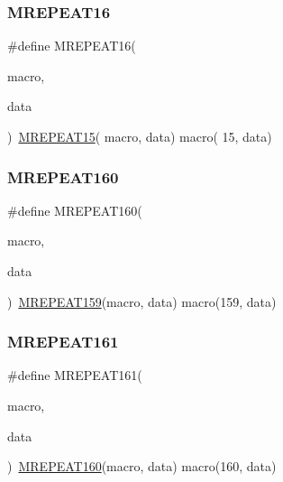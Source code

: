 \mbox{\label{group__group__sam0__utils__mrepeat_gaf3c066d33ccd6fd8378495955121baae}} 
\subsubsection{\texorpdfstring{MREPEAT16}{MREPEAT16}}
{\footnotesize\ttfamily \#define M\+R\+E\+P\+E\+A\+T16(\begin{DoxyParamCaption}\item[{}]{macro,  }\item[{}]{data }\end{DoxyParamCaption})~\mbox{\hyperlink{group__group__sam0__utils__mrepeat_gaa3c5de4c7a937ef2f00049285ed41a0a}{M\+R\+E\+P\+E\+A\+T15}}( macro, data)   macro( 15, data)}

\mbox{\label{group__group__sam0__utils__mrepeat_gad1af2da931db2624f37a6357de14bc12}} 
\subsubsection{\texorpdfstring{MREPEAT160}{MREPEAT160}}
{\footnotesize\ttfamily \#define M\+R\+E\+P\+E\+A\+T160(\begin{DoxyParamCaption}\item[{}]{macro,  }\item[{}]{data }\end{DoxyParamCaption})~\mbox{\hyperlink{group__group__sam0__utils__mrepeat_ga0ffc3b60afa702e0588da2e00ddb9e7e}{M\+R\+E\+P\+E\+A\+T159}}(macro, data)   macro(159, data)}

\mbox{\label{group__group__sam0__utils__mrepeat_ga8c32111637f7d8420f239a6de681667c}} 
\subsubsection{\texorpdfstring{MREPEAT161}{MREPEAT161}}
{\footnotesize\ttfamily \#define M\+R\+E\+P\+E\+A\+T161(\begin{DoxyParamCaption}\item[{}]{macro,  }\item[{}]{data }\end{DoxyParamCaption})~\mbox{\hyperlink{group__group__sam0__utils__mrepeat_gad1af2da931db2624f37a6357de14bc12}{M\+R\+E\+P\+E\+A\+T160}}(macro, data)   macro(160, data)}

